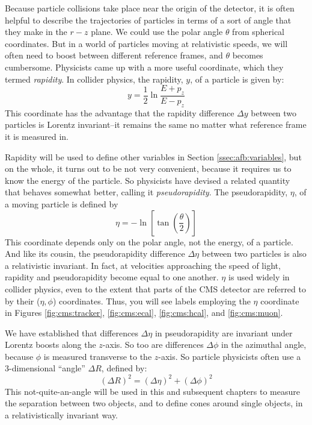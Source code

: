 Because particle collisions take place near the
origin of the detector, it
is often helpful to describe the trajectories of particles in terms of
a sort of angle that they make in the $r-z$ plane. We could use the
polar angle $\theta$ from spherical coordinates. But in a world of
particles moving at relativistic speeds, we will often need to boost
between different reference frames, and $\theta$ becomes
cumbersome. Physicists came up with a more useful coordinate, which
they termed \emph{rapidity}. In collider physics, the rapidity, $y$,
of a particle is given by:
\begin{equation}
\label{eq:cms:rapidity}
y = \frac{1}{2} \ln \frac{E+p_z}{E-p_z}
\end{equation}
This coordinate has the advantage that
the rapidity difference $\Delta y$ between two particles is Lorentz
invariant--it remains the same no matter what reference frame it is
measured in.

Rapidity will be used to define other variables in Section
\ref{ssec:afb:variables}, but on the whole, it turns out to be not
very convenient, because it requires us to know the energy of the
particle. So physicists have devised a related quantity that behaves
somewhat better, calling it \emph{pseudorapidity}. The pseudorapidity,
$\eta$, of a moving particle is defined by
\begin{equation}
\label{eq:cms:eta}
\eta = -\ln \left[ \tan \left( \frac{\theta}{2} \right) \right]
\end{equation}
This coordinate depends only on the polar angle, not the energy, of a
particle. And like its cousin, the pseudorapidity difference $\Delta\eta$
between two particles is also a relativistic invariant. In fact, at
velocities approaching the speed of light, rapidity and pseudorapidity
become equal to one another. $\eta$ is used widely in collider
physics, even to the extent that parts of the CMS detector are
referred to by their ($\eta, \phi$) coordinates. Thus, you will see
labels employing the $\eta$ coordinate in Figures
\ref{fig:cms:tracker}, \ref{fig:cms:ecal}, \ref{fig:cms:hcal}, and
\ref{fig:cms:muon}.

We have established that differences $\Delta \eta$ in pseudorapidity
are invariant under Lorentz boosts along the $z$-axis. So too are
differences $\Delta \phi$ in the azimuthal angle, because $\phi$ is
measured transverse to the $z$-axis. So particle physicists often
use a 3-dimensional ``angle'' $\Delta R$, defined by:
\begin{equation}
(\Delta R)^2 = (\Delta \eta)^2 + (\Delta \phi)^2
\end{equation}
This not-quite-an-angle will be used in this and subsequent chapters
to measure the separation between two objects, and to define cones
around single objects, in a relativistically invariant way.

